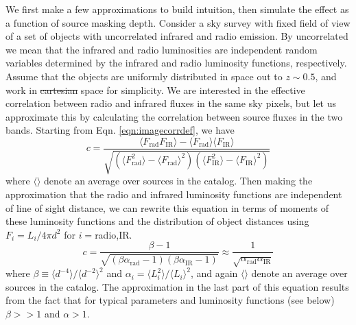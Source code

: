 \documentclass[numberedappendix]{emulateapj}
\newcommand{\rad}{\text{rad}}
\newcommand{\ir}{\text{IR}}
\providecommand{\DIFadd}[1]{{\protect\color{blue}\uwave{#1}}} %
\providecommand{\DIFdel}[1]{{\protect\color{red}\sout{#1}}}                      %
\providecommand{\DIFaddbegin}{} %
\providecommand{\DIFaddend}{} %
\providecommand{\DIFdelbegin}{} %
\providecommand{\DIFdelend}{} %
\begin{document}
We first make a few approximations to build intuition, then simulate the effect as a function of source masking depth. Consider a sky survey with fixed field of view of a set of objects with uncorrelated infrared and radio emission. By uncorrelated we mean that the infrared and radio luminosities are independent random variables determined by the infrared and radio luminosity functions, respectively. Assume that the objects are uniformly distributed in space out to $z\sim0.5$, and work in \DIFdelbegin \DIFdel{cartesian }\DIFdelend \DIFaddbegin \DIFadd{Cartesian }\DIFaddend space for simplicity. We are interested in the effective correlation between radio and infrared fluxes in the same sky pixels, but let us approximate this by calculating the correlation between source fluxes in the two bands. Starting from Eqn. \ref{eqn:imagecorrdef}, we have
\begin{equation} %
	c = \frac{\langle F_\rad F_\ir \rangle-\langle F_\rad\rangle\langle F_\ir\rangle}{\sqrt{(\langle F_\rad^2\rangle-\langle F_\rad\rangle^2)(\langle F_\ir^2\rangle-\langle F_\ir\rangle^2)}}
\end{equation}
where $\langle\rangle$ denote an average over sources in the catalog. Then making the approximation that the radio and infrared luminosity functions are independent of line of sight distance, we can rewrite this equation in terms of moments of these luminosity functions and the distribution of object distances using \DIFdelbegin \DIFdel{$F_i=L_i/4\pi d^2$ }\DIFdelend \DIFaddbegin \DIFadd{$F_i=L_i/4\pi D^2$ }\DIFaddend for $i=$radio,IR.
\begin{equation}
\label{eqn:cresult}
	c = \frac{\beta-1}{\sqrt{(\beta\alpha_\rad-1)(\beta\alpha_\ir-1)}}\approx\frac{1}{\sqrt{\alpha_\rad \alpha_\ir}}
\end{equation}
where \DIFdelbegin \DIFdel{$\beta\equiv\langle d^{-4}\rangle/\langle d^{-2}\rangle^2$ }\DIFdelend \DIFaddbegin \DIFadd{$\beta\equiv\langle D^{-4}\rangle/\langle D^{-2}\rangle^2$ }\DIFaddend and $\alpha_i=\langle L_i^2\rangle/\langle L_i\rangle^2$, and again $\langle\rangle$ denote an average over sources in the catalog. The approximation in the last part of this equation results from the fact that for typical parameters and luminosity functions (see below) $\beta>>1$ and $\alpha>1$. 
\end{document}
